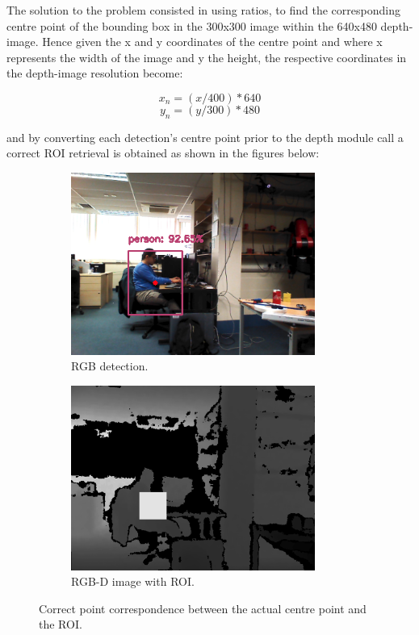 The solution to the problem consisted in using ratios, to find the corresponding centre point of the bounding box in the 300x300 image within the 640x480 depth-image. Hence given the x and y coordinates of the centre point and where x represents the width of the image and y the height, the respective coordinates in the depth-image resolution become:

\[x_n = (x/400) * 640 \]
\[y_n = (y/300) * 480 \]

and by converting each detection's centre point prior to the depth module call a correct ROI retrieval is obtained as shown in the figures below:

\begin{figure}[H]
	\centering
    \begin{subfigure}{.5\textwidth}
      \centering
      \includegraphics[width=8cm]{images/chapter4_rgb_ratio.png}
      \caption{RGB detection.}
      \label{fig:ratin}
    \end{subfigure}%
    
    \begin{subfigure}{.5\textwidth}
      \centering
      \includegraphics[width=8cm]{images/chapter4_rgbd_ratio.png}
      \caption{RGB-D image with ROI.}
      \label{fig:ration}
    \end{subfigure}%
    
    \caption{Correct point correspondence between the actual centre point and the ROI.}
\end{figure}

